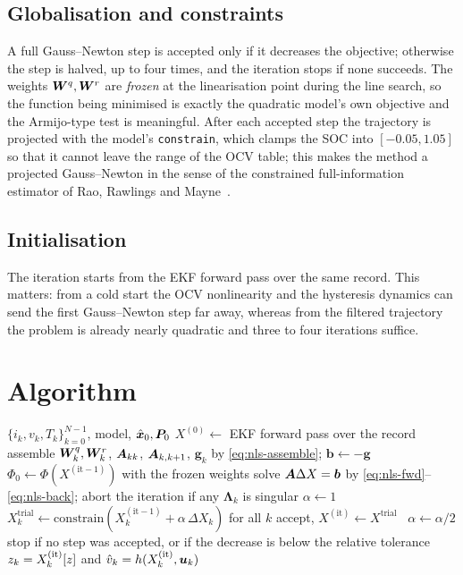 \subsection{Globalisation and constraints}
A full Gauss--Newton step is accepted only if it decreases the objective; otherwise the step is
halved, up to four times, and the iteration stops if none succeeds.  The weights $\bm{W}^q,\bm{W}^r$ are
\emph{frozen} at the linearisation point during the line search, so the function being minimised is
exactly the quadratic model's own objective and the Armijo-type test is meaningful.  After each
accepted step the trajectory is projected with the model's \texttt{constrain}, which clamps the SOC
into $[-0.05,1.05]$ so that it cannot leave the range of the OCV table; this makes the method a
projected Gauss--Newton in the sense of the constrained full-information estimator of Rao, Rawlings
and Mayne~\cite{rao2003mhe}.

\subsection{Initialisation}
The iteration starts from the EKF forward pass over the same record.  This matters: from a cold
start the OCV nonlinearity and the hysteresis dynamics can send the first Gauss--Newton step far
away, whereas from the filtered trajectory the problem is already nearly quadratic and three to four
iterations suffice.

\section{Algorithm}
\begin{algorithm}[H]
\caption{Batch-NLS --- whole record}
\begin{algorithmic}[1]
\Require $\{i_k,v_k,T_k\}_{k=0}^{N-1}$, model, $\hat{\bm{x}}_0,\bm{P}_0$
\State $X^{(0)}\gets$ EKF forward pass over the record
  \State assemble $\bm{W}^q_k,\bm{W}^r_k$, $\bm{A}_{kk}$, $\bm{A}_{k,k+1}$, $\bm{g}_k$ by \eqref{eq:nls-assemble}; $\bm{b}\gets-\bm{g}$
  \State $\Phi_0\gets\Phi(X^{(\text{it}-1)})$ with the frozen weights
  \State solve $\bm{A}\Delta X=\bm{b}$ by \eqref{eq:nls-fwd}--\eqref{eq:nls-back}; abort the iteration if any $\bm{\Lambda}_k$ is singular
  \State $\alpha\gets1$
  \Repeat
     \State $X^\text{trial}_k\gets\mathrm{constrain}\!\left(X^{(\text{it}-1)}_k+\alpha\,\Delta X_k\right)$ for all $k$
      accept, $X^{(\text{it})}\gets X^\text{trial}$ \Else\ $\alpha\gets\alpha/2$ \EndIf
  \State stop if no step was accepted, or if the decrease is below the relative tolerance
\EndFor
\Ensure $z_k=X^{(\text{it})}_k[z]$ and $\hat v_k=h(X^{(\text{it})}_k,\bm{u}_k)$
\end{algorithmic}
\end{algorithm}

